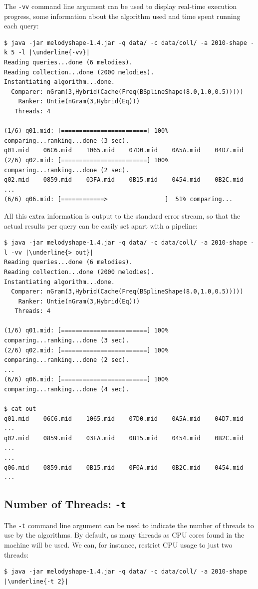\documentclass[twoside]{article}
\begin{document}
The \texttt{-vv} command line argument can be used to display real-time execution progress, some information about the algorithm used and time spent running each query:
\begin{lstlisting}
$ java -jar melodyshape-1.4.jar -q data/ -c data/coll/ -a 2010-shape -k 5 -l |\underline{-vv}|
Reading queries...done (6 melodies).
Reading collection...done (2000 melodies).
Instantiating algorithm...done.
  Comparer: nGram(3,Hybrid(Cache(Freq(BSplineShape(8.0,1.0,0.5)))))
    Ranker: Untie(nGram(3,Hybrid(Eq)))
   Threads: 4
 
(1/6) q01.mid: [========================] 100% comparing...ranking...done (3 sec).
q01.mid    06C6.mid    1065.mid    07D0.mid    0A5A.mid    04D7.mid
(2/6) q02.mid: [========================] 100% comparing...ranking...done (2 sec).
q02.mid    0859.mid    03FA.mid    0B15.mid    0454.mid    0B2C.mid
...
(6/6) q06.mid: [============>                ]  51% comparing...
\end{lstlisting}

All this extra information is output to the standard error stream, so that the actual results per query can be easily set apart with a pipeline:
\begin{lstlisting}
$ java -jar melodyshape-1.4.jar -q data/ -c data/coll/ -a 2010-shape -l -vv |\underline{> out}|
Reading queries...done (6 melodies).
Reading collection...done (2000 melodies).
Instantiating algorithm...done.
  Comparer: nGram(3,Hybrid(Cache(Freq(BSplineShape(8.0,1.0,0.5)))))
    Ranker: Untie(nGram(3,Hybrid(Eq)))
   Threads: 4
 
(1/6) q01.mid: [========================] 100% comparing...ranking...done (3 sec).
(2/6) q02.mid: [========================] 100% comparing...ranking...done (2 sec).
...
(6/6) q06.mid: [========================] 100% comparing...ranking...done (4 sec).

$ cat out
q01.mid    06C6.mid    1065.mid    07D0.mid    0A5A.mid    04D7.mid ...
q02.mid    0859.mid    03FA.mid    0B15.mid    0454.mid    0B2C.mid ...
...
q06.mid    0859.mid    0B15.mid    0F0A.mid    0B2C.mid    0454.mid ...
\end{lstlisting}

\subsection{Number of Threads: \texttt{-t}}

The \texttt{-t} command line argument can be used to indicate the number of threads to use by the algorithms. By default, as many threads as CPU cores found in the machine will be used. We can, for instance, restrict CPU usage to just two threads:
\begin{lstlisting}
$ java -jar melodyshape-1.4.jar -q data/ -c data/coll/ -a 2010-shape |\underline{-t 2}|
\end{lstlisting}
\end{document}

